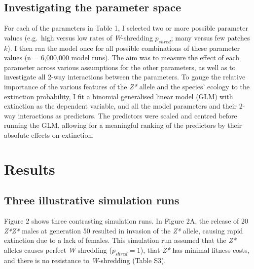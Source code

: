 \documentclass[]{rsos}%
\begin{document}
\hypertarget{investigating-the-parameter-space}{%
\subsection{Investigating the parameter
space}\label{investigating-the-parameter-space}}

For each of the parameters in Table 1, I selected two or more possible
parameter values (e.g.~high versus low rates of \emph{W}-shredding
\(p_{shred}\); many versus few patches \(k\)). I then ran the model once
for all possible combinations of these parameter values (n = 6,000,000
model runs). The aim was to measure the effect of each parameter across
various assumptions for the other parameters, as well as to investigate
all 2-way interactions between the parameters. To gauge the relative
importance of the various features of the \emph{Z*} allele and the
species' ecology to the extinction probability, I fit a binomial
generalised linear model (GLM) with extinction as the dependent
variable, and all the model parameters and their 2-way interactions as
predictors. The predictors were scaled and centred before running the
GLM, allowing for a meaningful ranking of the predictors by their
absolute effects on extinction.

\hypertarget{results}{%
\section{Results}\label{results}}

\hypertarget{three-illustrative-simulation-runs}{%
\subsection{Three illustrative simulation
runs}\label{three-illustrative-simulation-runs}}

Figure 2 shows three contrasting simulation runs. In Figure 2A, the
release of 20 \emph{Z*Z*} males at generation 50 resulted in invasion of
the \emph{Z*} allele, causing rapid extinction due to a lack of females.
This simulation run assumed that the \emph{Z*} alleles causes perfect
\emph{W}-shredding (\(p_{shred} = 1\)), that \emph{Z*} has minimal
fitness costs, and there is no resistance to \emph{W}-shredding (Table
S3).
\end{document}
